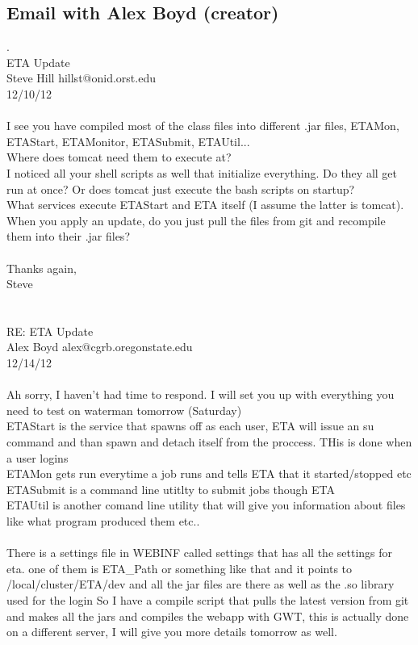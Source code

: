 \documentclass[a4paper,12pt]{article}
\begin{document}
 \subsection{Email with Alex Boyd (creator)}
.\\
ETA Update\\
Steve Hill hillst@onid.orst.edu\\
12/10/12\\
\\
I see you have compiled most of the class files into different .jar files, ETAMon, ETAStart, ETAMonitor, ETASubmit, ETAUtil...
\\
Where does tomcat need them to execute at?
\\
I noticed all your shell scripts as well that initialize everything. Do they all get run at once? Or does tomcat just execute the bash scripts on startup?
\\
What services execute ETAStart and ETA itself (I assume the latter is tomcat).
\\
When you apply an update, do you just pull the files from git and recompile them into their .jar files?
\\\\
Thanks again,
\\
Steve
\\\\\\
RE: ETA Update\\
Alex Boyd alex@cgrb.oregonstate.edu\\
12/14/12
 \\\\
Ah sorry, I haven't had time to respond. I will set you up with everything you need to test on waterman tomorrow (Saturday) 
\\
ETAStart is the service that spawns off as each user, ETA will issue an su command and than spawn and detach itself from the proccess. THis is done when a user logins\\
ETAMon gets run everytime a job runs and tells ETA that it started/stopped etc\\
ETASubmit is a command line utitlty to submit jobs though ETA\\
ETAUtil is another comand line utility that will give you information about files like what program produced them etc..
\\\\
There is a settings file in WEB\-INF called settings that has all the settings for eta. one of them is ETA\_Path or something like that and it points to /local/cluster/ETA/dev and all the jar files are there as well as the .so library used for the login 
So I have a compile script that pulls the latest version from git and makes all the jars and compiles the webapp with GWT, this is actually done on a different server, I will give you more details tomorrow as well.
\end{document}
